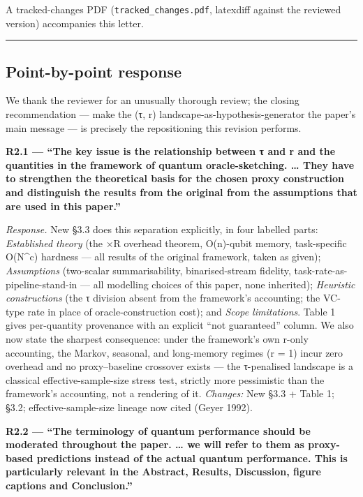 \documentclass[
  11pt,
]{article}
\begin{document}
A tracked-changes PDF (\texttt{tracked\_changes.pdf}, latexdiff against
the reviewed version) accompanies this letter.

\begin{center}\rule{0.5\linewidth}{0.5pt}\end{center}

\subsection{Point-by-point response}\label{point-by-point-response}

We thank the reviewer for an unusually thorough review; the closing
recommendation --- make the (τ, r) landscape-as-hypothesis-generator the
paper's main message --- is precisely the repositioning this revision
performs.

\textbf{R2.1 --- ``The key issue is the relationship between τ and r and
the quantities in the framework of quantum oracle-sketching. \ldots{}
They have to strengthen the theoretical basis for the chosen proxy
construction and distinguish the results from the original from the
assumptions that are used in this paper.''}

\emph{Response.} New §3.3 does this separation explicitly, in four
labelled parts: \emph{Established theory} (the ×R overhead theorem,
O(n)-qubit memory, task-specific O(N\^{}c) hardness --- all results of
the original framework, taken as given); \emph{Assumptions} (two-scalar
summarisability, binarised-stream fidelity,
task-rate-as-pipeline-stand-in --- all modelling choices of this paper,
none inherited); \emph{Heuristic constructions} (the τ division absent
from the framework's accounting; the VC-type rate in place of
oracle-construction cost); and \emph{Scope limitations}. Table 1 gives
per-quantity provenance with an explicit ``not guaranteed'' column. We
also now state the sharpest consequence: under the framework's own
r-only accounting, the Markov, seasonal, and long-memory regimes (r = 1)
incur zero overhead and no proxy--baseline crossover exists --- the
τ-penalised landscape is a classical effective-sample-size stress test,
strictly more pessimistic than the framework's accounting, not a
rendering of it. \emph{Changes:} New §3.3 + Table 1; §3.2;
effective-sample-size lineage now cited (Geyer 1992).

\textbf{R2.2 --- ``The terminology of quantum performance should be
moderated throughout the paper. \ldots{} we will refer to them as
proxy-based predictions instead of the actual quantum performance. This
is particularly relevant in the Abstract, Results, Discussion, figure
captions and Conclusion.''}
\end{document}
